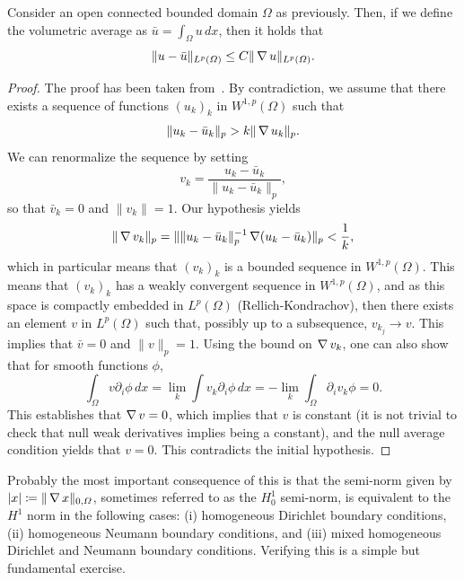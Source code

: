 \begin{lemma}\label{lemma:poincare-wirtinger-inequality}
    Consider an open connected bounded domain $\Omega$ as previously. Then, if we define the volumetric average as $\bar u = \int_\Omega u\,dx$, then it holds that
    \begin{equation}\label{eq:poincare-wirtinger-inequality}
        \| u - \bar u \|_{L^p(\Omega)} \leq C \| \operatorname{\nabla} u \|_{L^p(\Omega)}.
    \end{equation}
    \begin{proof}
        The proof has been taken from~\cite{evans2022partial}. By contradiction, we assume that there exists a sequence of functions $(u_k)_k$ in $W^{1,p}(\Omega)$ such that
        \begin{equation*}
            \| u_k - \bar u_k \|_p > k \| \operatorname{\nabla} u_k \|_p.
        \end{equation*}
        We can renormalize the sequence by setting
        \begin{equation*}
            v_k = \frac{u_k - \bar u_k}{\|u_k - \bar u_k\|_p},
        \end{equation*}
        so that $ \bar v_k = 0$ and $\| v_k \| = 1$. Our hypothesis yields
        \begin{equation*}
            \| \operatorname{\nabla} v_k \|_p = \| \|u_k - \bar u_k\|_p^{-1} \operatorname{\nabla} (u_k - \bar u_k) \|_p < \frac 1 k,
        \end{equation*}
        which in particular means that $(v_k)_k$ is a bounded sequence in $W^{1,p}(\Omega)$. This means that $(v_k)_k$ has a weakly convergent sequence in $W^{1,p}(\Omega)$, and as this space is compactly embedded in $L^p(\Omega)$ (Rellich-Kondrachov), then there exists an element $v$ in $L^p(\Omega)$ such that, possibly up to a subsequence, $v_{k_j} \to v$. This implies that $\bar v=0$ and $\|v\|_p=1$. Using the bound on $\operatorname{\nabla} v_k$, one can also show that for smooth functions $\phi$, 
        \begin{equation*}
            \int_\Omega v \partial_i \phi\,dx = \lim_k \int v_k \partial_i \phi\,dx = - \lim_k \int_\Omega \partial_i v_k \phi = 0.
        \end{equation*}
        This establishes that $\operatorname{\nabla} v=0$, which implies that $v$ is constant (it is not trivial to check that null weak derivatives implies being a constant), and the null average condition yields that $v=0$. This contradicts the initial hypothesis. 
    \end{proof}
\end{lemma}

Probably the most important consequence of this is that the semi-norm given by $| x | \coloneqq \|\operatorname{\nabla} x\|_{0,\Omega}$, sometimes referred to as the $H_0^1$ semi-norm, is equivalent to the $H^1$ norm in the following cases: (i) homogeneous Dirichlet boundary conditions, (ii) homogeneous Neumann boundary conditions, and (iii) mixed homogeneous Dirichlet and Neumann boundary conditions. Verifying this is a simple but fundamental exercise.
